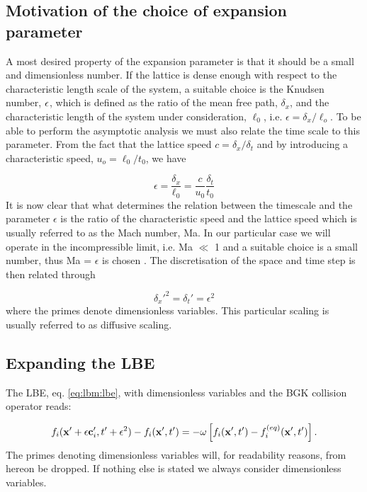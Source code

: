 \subsection{Motivation of the choice of expansion parameter}
A most desired property of the expansion parameter is that it should
be a small and dimensionless number. If the lattice is dense enough with
respect to the characteristic length scale of the system, a suitable
choice is the Knudsen number, $\epsilon$, which is defined as the ratio of
the mean free path, $\delta_x$, and the characteristic length of the
system under consideration, $\ell_0$, i.e. $\epsilon = \delta_x
/\ell_o$. To be able to perform the asymptotic analysis we must also
relate the time scale to this parameter. From the fact that the
lattice speed $c = \delta_x/\delta_t$ and by introducing a
characteristic speed, $u_o = \ell_0/t_0$, we have

\begin{equation}\label{eq:lbm:rel}
\epsilon = \frac{\delta_x}{\ell_0} = \frac{c}{u_0}\frac{\delta_t}{t_0}
\end{equation}
It is now clear that what determines the relation between the
timescale and the parameter $\epsilon$ is the ratio of the
characteristic speed and the lattice speed which is usually referred
to as the Mach number, Ma. In our particular case we will operate in
the incompressible limit, i.e. Ma $\ll$ 1 and a suitable choice is a
small number, thus Ma = $\epsilon$ is chosen \cite{junk-boundary}. The
discretisation of the space and time step is then related through

\begin{equation}
\delta_x'^2 = \delta_t' = \epsilon^2
\end{equation}
where the primes denote dimensionless variables. This particular
scaling is usually referred to as diffusive scaling.

\subsection{Expanding the LBE}
The LBE, eq. \eqref{eq:lbm:lbe}, with dimensionless variables and the
BGK collision operator reads:

\begin{equation}\label{eq:lbm:nodim_lbe}
f_i(\mathbf{x}' + \epsilon \mathbf{c}_i', t' + \epsilon^2) - f_i(\mathbf{x}', t') = -\omega \left[
  f_i(\mathbf{x}', t') - f_i^{(eq)}(\mathbf{x}', t') \right].
\end{equation} 
The primes denoting dimensionless variables will, for readability
reasons, from hereon be dropped. If nothing else is stated we always
consider dimensionless variables.

